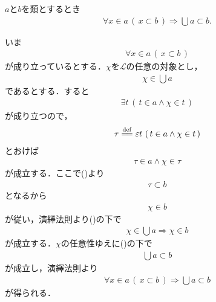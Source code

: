 	\begin{screen}
		\begin{thm}[部分集合の合併は部分類]\label{thm:union_of_subsets_is_subclass}
			$a$と$b$を類とするとき
			\begin{align}
				\forall x \in a\, (\, x \subset b\, ) \Longrightarrow \bigcup a \subset b.
			\end{align}
		\end{thm}
	\end{screen}
	
	\begin{sketch}
		いま
		\begin{align}
			\forall x \in a\, (\, x \subset b\, )
			\label{fom:thm_union_of_subsets_is_subclass_1}
		\end{align}
		が成り立っているとする．$\chi$を$\mathcal{L}$の任意の対象とし，
		\begin{align}
			\chi \in \bigcup a
		\end{align}
		であるとする．すると
		\begin{align}
			\exists t\, \left(\, t \in a \wedge \chi \in t\, \right)
		\end{align}
		が成り立つので，
		\begin{align}
			\tau \defeq \varepsilon t\, \left(\, t \in a \wedge \chi \in t\, \right)
		\end{align}
		とおけば
		\begin{align}
			\tau \in a \wedge \chi \in \tau
		\end{align}
		が成立する．ここで()より
		\begin{align}
			\tau \subset b
		\end{align}
		となるから
		\begin{align}
			\chi \in b
		\end{align}
		が従い，演繹法則より()の下で
		\begin{align}
			\chi \in \bigcup a \Longrightarrow \chi \in b
		\end{align}
		が成立する．$\chi$の任意性ゆえに()の下で
		\begin{align}
			\bigcup a \subset b
		\end{align}
		が成立し，演繹法則より
		\begin{align}
			\forall x \in a\, (\, x \subset b\, ) \Longrightarrow \bigcup a \subset b
		\end{align}
		が得られる．
		\QED
	\end{sketch}
	
